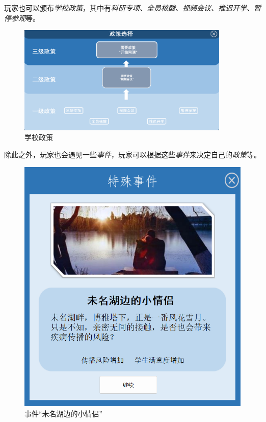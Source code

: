 \documentclass[hyperref,a4paper,UTF8]{ctexart}
\begin{document}
玩家也可以颁布\textit{学校政策}，其中有\textit{科研专项、全员核酸、视频会议、推迟开学、暂停参观}等。

\begin{figure}[h]
    \centering
    \includegraphics[width=0.9\textwidth]{police_choice.png}
    \caption{学校政策}
    \label{fig:police_choice}
\end{figure}

除此之外，玩家也会遇见一些\textit{事件}，玩家可以根据这些\textit{事件}来决定自己的\textit{政策}等。

\begin{figure}[h]
    \centering
    \includegraphics[scale=0.7]{sj.png}
    \caption{事件“未名湖边的小情侣”}
\end{figure}
\end{document}
